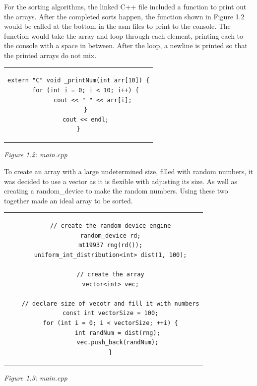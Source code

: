 \documentclass[twoside]{article}
\begin{document}
For the sorting algorithms, the linked C++ file included a function to print out the arrays. After the completed sorts happen, the function shown in Figure 1.2 would be called at the bottom in the asm files to print to the console. The function would take the array and loop through each element, printing each to the console with a space in between. After the loop, a newline is printed so that the printed arrays do not mix.
\begin{center} \begin{tabular}{c} \begin{lstlisting}
extern "C" void _printNum(int arr[10]) {
	for (int i = 0; i < 10; i++) {
		cout << " " << arr[i];
	}
	cout << endl;
}
\end{lstlisting} \end{tabular} \end{center}
\begin{center}\textit{Figure 1.2: main.cpp}\end{center}
To create an array with a large undetermined size, filled with random numbers, it was decided to use a vector as it is flexible with adjusting its size. As well as creating a random\_device to make the random numbers. Using these two together made an ideal array to be sorted. 
\begin{center} \begin{tabular}{c} \begin{lstlisting}
	// create the random device engine
	random_device rd;
	mt19937 rng(rd());
	uniform_int_distribution<int> dist(1, 100);

	// create the array
	vector<int> vec;

	// declare size of vecotr and fill it with numbers
	const int vectorSize = 100;
	for (int i = 0; i < vectorSize; ++i) {
		int randNum = dist(rng);
		vec.push_back(randNum);
	}
\end{lstlisting} \end{tabular} \end{center}
\begin{center}\textit{Figure 1.3: main.cpp}\end{center}
\end{document}
